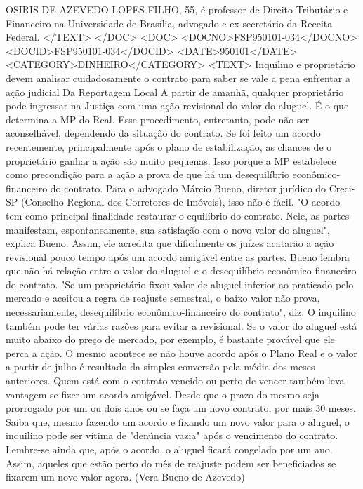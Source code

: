 OSIRIS DE AZEVEDO LOPES FILHO, 55, é professor de Direito Tributário e Financeiro na Universidade de Brasília, advogado e ex-secretário da Receita Federal.
</TEXT>
</DOC>
<DOC>
<DOCNO>FSP950101-034</DOCNO>
<DOCID>FSP950101-034</DOCID>
<DATE>950101</DATE>
<CATEGORY>DINHEIRO</CATEGORY>
<TEXT>
Inquilino e proprietário devem analisar cuidadosamente o contrato para saber se vale a pena enfrentar a ação judicial 
Da Reportagem Local 
A partir de amanhã, qualquer proprietário pode ingressar na Justiça com uma ação revisional do valor do aluguel. É o que determina a MP do Real.
Esse procedimento, entretanto, pode não ser aconselhável, dependendo da situação do contrato.
Se foi feito um acordo recentemente, principalmente após o plano de estabilização, as chances de o proprietário ganhar a ação são muito pequenas.
Isso porque a MP estabelece como precondição para a ação a prova de que há um desequilíbrio econômico-financeiro do contrato.
Para o advogado Márcio Bueno, diretor jurídico do Creci-SP (Conselho Regional dos Corretores de Imóveis), isso não é fácil.
"O acordo tem como principal finalidade restaurar o equilíbrio do contrato. Nele, as partes manifestam, espontaneamente, sua satisfação com o novo valor do aluguel", explica Bueno.
Assim, ele acredita que dificilmente os juízes acatarão a ação revisional pouco tempo após um acordo amigável entre as partes.
Bueno lembra que não há relação entre o valor do aluguel e o desequilíbrio econômico-financeiro do contrato. "Se um proprietário fixou valor de aluguel inferior ao praticado pelo mercado e aceitou a regra de reajuste semestral, o baixo valor não prova, necessariamente, desequilíbrio econômico-financeiro do contrato", diz.
O inquilino também pode ter várias razões para evitar a revisional. Se o valor do aluguel está muito abaixo do preço de mercado, por exemplo, é bastante provável que ele perca a ação.
O mesmo acontece se não houve acordo após o Plano Real e o valor a partir de julho é resultado da simples conversão pela média dos meses anteriores.
Quem está com o contrato vencido ou perto de vencer também leva vantagem se fizer um acordo amigável. Desde que o prazo do mesmo seja prorrogado por um ou dois anos ou se faça um novo contrato, por mais 30 meses.
Saiba que, mesmo fazendo um acordo e fixando um novo valor para o aluguel, o inquilino pode ser vítima de "denúncia vazia" após o vencimento do contrato.
Lembre-se ainda que, após o acordo, o aluguel ficará congelado por um ano. Assim, aqueles que estão perto do mês de reajuste podem ser beneficiados se fixarem um novo valor agora.
(Vera Bueno de Azevedo)
